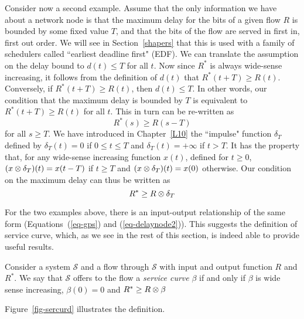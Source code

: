 Consider now a second example. Assume that the only information we
have about a network node is that the maximum delay for the bits
of a given flow $R$ is bounded by some fixed value $T$, and that
the bits of the flow are served in first in, first out order. We
will see in Section~\ref{shapers} that this is used with a family
of schedulers called ``earliest deadline first" (EDF). We can
translate the assumption on the delay bound to $d(t) \leq T$ for
all $t$.  Now since $R^*$ is always wide-sense increasing, it
follows from the definition of $d(t)$ that $R^*(t+T) \geq R(t)$.
Conversely, if $R^*(t+T) \geq R(t)$, then $d(t) \leq T$. In other
words, our condition that the maximum delay is bounded by $T$ is
equivalent to $R^*(t+T) \geq R(t)$ for all $t$. This in turn can
be re-written as $$R^*(s) \geq R(s-T) $$for all $s \geq T$. We
have introduced in Chapter~\ref{L10} the ``impulse" function
$\delta_{T}$ defined by $\delta_{T}(t)=0$ if $0\leq t \leq T$ and
$\delta_{T}(t)=+\infty $ if $ t > T$. It has the property that,
for any wide-sense increasing function $x(t)$, defined for $t \geq
0$, $(x \otimes \delta_T)(t)=x(t-T)$ if $ t \geq T$ and $(x \otimes
\delta_T)(t)=x(0)$ otherwise. Our condition on the maximum delay
can thus be written as
\begin{equation}\mylabel{eq-delaynode2}
 R^* \geq R\mpc \delta_T
\end{equation}

For the two examples above, there is an input-output relationship
of the same form (Equations~(\ref{eq-gps}) and
(\ref{eq-delaynode2})). This suggests the definition of service
curve, which, as we see in the rest of this section, is indeed
able to provide useful results.
\begin{figure}[!htbp]
\end{figure}

\begin{definition}
 Consider a  system $\mathcal{S}$ and a
flow through $\mathcal{S}$ with input and output function $R$
and $R^{*}$. We say that $\mathcal{S}$ offers to the flow a
\emph{service curve} $\beta$ if and only if $\beta$ is wide
sense increasing, $\beta(0)=0$ and $R^{*} \geq R \otimes \beta$
\end{definition}
Figure~\ref{fig-sercurd} illustrates the definition.

